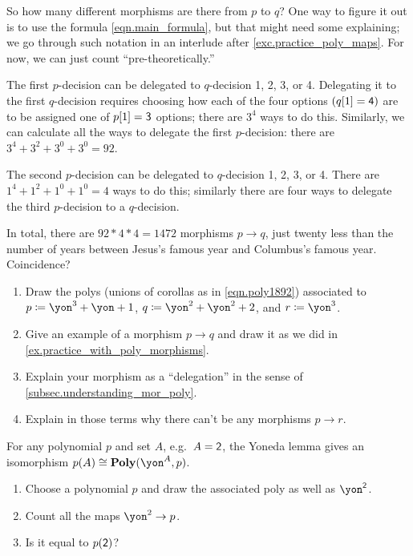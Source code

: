 \documentclass[Book-Poly]{subfiles}
\begin{document}
\begin{example}
So how many different morphisms are there from $p$ to $q$? One way to figure it out is to use the formula \eqref{eqn.main_formula}, but that might need some explaining; we go through such notation in an interlude after \cref{exc.practice_poly_maps}. For now, we can just count ``pre-theoretically.''

The first $p$-decision can be delegated to $q$-decision 1, 2, 3, or 4. Delegating it to the first $q$-decision requires choosing how each of the four options $(q[1]=\textsf{4})$ are to be assigned one of $p[1]=\textsf{3}$ options; there are $3^4$ ways to do this. Similarly, we can calculate all the ways to delegate the first $p$-decision: there are $3^4+3^2+3^0+3^0=92$. 

The second $p$-decision can be delegated to $q$-decision 1, 2, 3, or 4. There are $1^4+1^2+1^0+1^0=4$ ways to do this; similarly there are four ways to delegate the third $p$-decision to a $q$-decision.

In total, there are $92*4*4=1472$ morphisms $p\to q$, just twenty less than the number of years between Jesus's famous year and Columbus's famous year. Coincidence? 
\end{example}

\begin{exercise}\label{exc.practice_poly_maps}
\begin{enumerate}
	\item Draw the polys (unions of corollas as in \cref{eqn.poly1892}) associated to $p\coloneqq\yon^3+\yon+1$, $q\coloneqq \yon^2+\yon^2+2$, and $r\coloneqq\yon^3$.
	\item Give an example of a morphism $p\to q$ and draw it as we did in \cref{ex.practice_with_poly_morphisms}.
	\item Explain your morphism as a ``delegation'' in the sense of \cref{subsec.understanding_mor_poly}.
	\item Explain in those terms why there can't be any morphisms $p\to r$.
\qedhere
\end{enumerate}
\end{exercise}

\begin{exercise}
For any polynomial $p$ and set $A$, e.g.\ $A=\textsf{2}$, the Yoneda lemma gives an isomorphism $p(A)\cong \poly(\yon^A,p)$.
\begin{enumerate}
	\item Choose a polynomial $p$ and draw the associated poly as well as $\yon^\2$.
	\item Count all the maps $\yon^2\to p$.
	\item Is it equal to $p(\textsf{2})$?
\qedhere
\end{enumerate}
\end{exercise}
\end{document}
